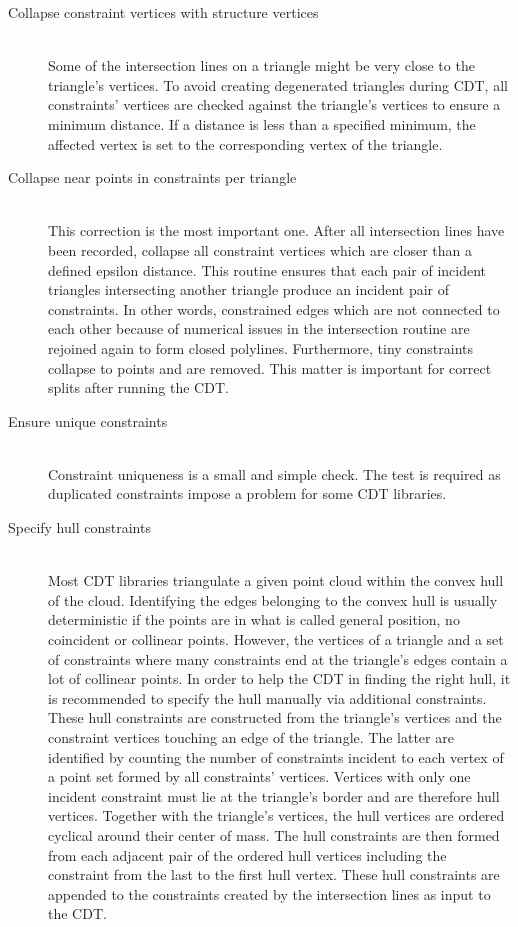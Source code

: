 \begin{description}
	\item[Collapse constraint vertices with structure vertices] \hfill \\
	Some of the intersection lines on a triangle might be very close to the triangle's vertices.
	To avoid creating degenerated triangles during CDT, all constraints' vertices are checked against the triangle's vertices to ensure a minimum distance.
	If a distance is less than a specified minimum, the affected vertex is set to the corresponding vertex of the triangle.


	\item[Collapse near points in constraints per triangle] \hfill \\
	This correction is the most important one.
	After all intersection lines have been recorded, collapse all constraint vertices which are closer than a defined epsilon distance.
	This routine ensures that each pair of incident triangles intersecting another triangle produce an incident pair of constraints.
	In other words, constrained edges which are not connected to each other because of numerical issues in the intersection routine are rejoined again to form closed polylines.
	Furthermore, tiny constraints collapse to points and are removed.
	This matter is important for correct splits after running the CDT.


	\item[Ensure unique constraints] \hfill \\
	Constraint uniqueness is a small and simple check.
	The test is required as duplicated constraints impose a problem for some CDT libraries.


	\item[Specify hull constraints] \hfill \\
	Most CDT libraries triangulate a given point cloud within the convex hull of the cloud.
	Identifying the edges belonging to the convex hull is usually deterministic if the points are in what is called general position, \ie no coincident or collinear points.
	However, the vertices of a triangle and a set of constraints where many constraints end at the triangle's edges contain a lot of collinear points.
	In order to help the CDT in finding the right hull, it is recommended to specify the hull manually via additional constraints.
	These hull constraints are constructed from the triangle's vertices and the constraint vertices touching an edge of the triangle.
	The latter are identified by counting the number of constraints incident to each vertex of a point set formed by all constraints' vertices.
	Vertices with only one incident constraint must lie at the triangle's border and are therefore hull vertices.
	Together with the triangle's vertices, the hull vertices are ordered cyclical around their center of mass.
	The hull constraints are then formed from each adjacent pair of the ordered hull vertices including the constraint from the last to the first hull vertex.
	These hull constraints are appended to the constraints created by the intersection lines as input to the CDT.



\end{description}

